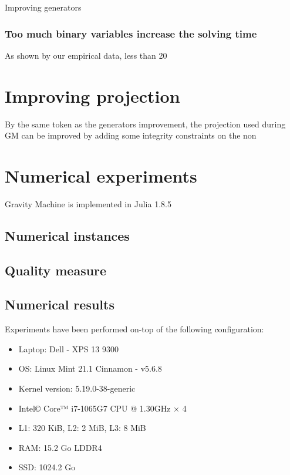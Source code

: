 \begin{algorithm}
\caption{Improving generators}\label{alg:Generators_improvement}
\end{algorithm}
\subsubsection{Too much binary variables increase the solving time}
As shown by our empirical data, less than 20

\section{Improving projection}
By the same token as the generators improvement, the projection used during GM can be improved by adding some integrity constraints on the non 

\section{Numerical experiments}
Gravity Machine is implemented in Julia 1.8.5 \cite{Julia-2017}
\subsection{Numerical instances}
\subsection{Quality measure}
\subsection{Numerical results}
Experiments have been performed on-top of the following configuration:
\begin{itemize}
    \item Laptop: Dell - XPS 13 9300
    \item OS: Linux Mint 21.1 Cinnamon - v5.6.8
    \item Kernel version: 5.19.0-38-generic
    \item Intel© Core™ i7-1065G7 CPU @ 1.30GHz × 4
    \item L1: 320 KiB, L2: 2 MiB, L3: 8 MiB
    \item RAM: 15.2 Go LDDR4
    \item SSD: 1024.2 Go
\end{itemize}
\subsubsection{}